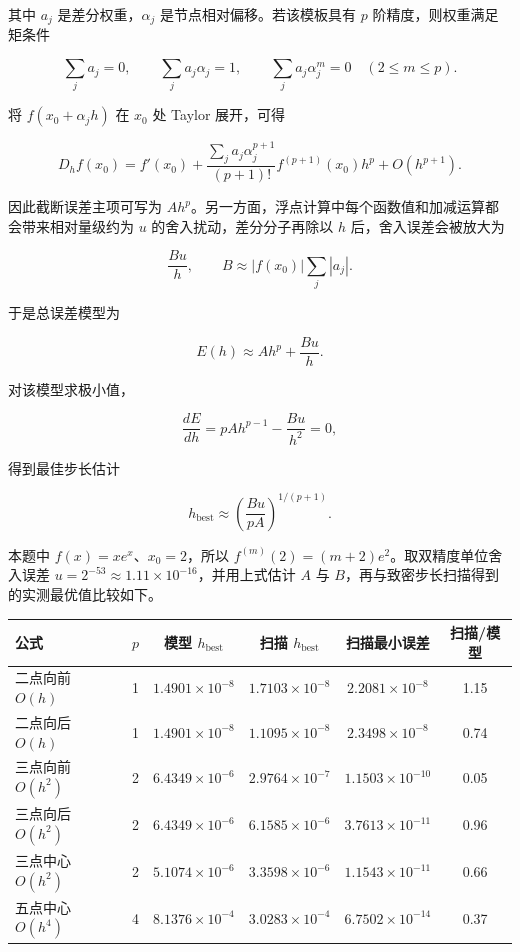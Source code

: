 \documentclass[12pt,a4paper,fontset=none]{ctexart}
\renewcommand{\arraystretch}{1.16}%
\begin{document}
其中 \(a_j\) 是差分权重，\(\alpha_j\) 是节点相对偏移。若该模板具有 \(p\) 阶精度，则权重满足矩条件

\[
\sum_j a_j=0,\qquad
\sum_j a_j\alpha_j=1,\qquad
\sum_j a_j\alpha_j^m=0\quad (2\le m\le p).
\]

将 \(f(x_0+\alpha_jh)\) 在 \(x_0\) 处 Taylor 展开，可得

\[
D_h f(x_0)
=f'(x_0)
+\frac{\sum_j a_j\alpha_j^{p+1}}{(p+1)!}f^{(p+1)}(x_0)h^p
+O(h^{p+1}).
\]

因此截断误差主项可写为 \(Ah^p\)。另一方面，浮点计算中每个函数值和加减运算都会带来相对量级约为 \(u\) 的舍入扰动，差分分子再除以 \(h\) 后，舍入误差会被放大为

\[
\frac{Bu}{h},\qquad
B\approx |f(x_0)|\sum_j |a_j|.
\]

于是总误差模型为

\[
E(h)\approx Ah^p+\frac{Bu}{h}.
\]

对该模型求极小值，

\[
\frac{dE}{dh}=pAh^{p-1}-\frac{Bu}{h^2}=0,
\]

得到最佳步长估计

\[
h_{\mathrm{best}}\approx \left(\frac{Bu}{pA}\right)^{1/(p+1)}.
\]

本题中 \(f(x)=xe^x\)、\(x_0=2\)，所以 \(f^{(m)}(2)=(m+2)e^2\)。取双精度单位舍入误差 \(u=2^{-53}\approx 1.11\times 10^{-16}\)，并用上式估计 \(A\) 与 \(B\)，再与致密步长扫描得到的实测最优值比较如下。

\begin{table}[H]
  \centering
  \small
  \setlength{\tabcolsep}{3pt}
  \renewcommand{\arraystretch}{1.12}
  \begin{tabular*}{\linewidth}{@{\extracolsep{\fill}}lccccc}
    \toprule
    公式 & \(p\) & 模型 \(h_{\mathrm{best}}\) & 扫描 \(h_{\mathrm{best}}\) & 扫描最小误差 & 扫描/模型 \\
    \midrule
    二点向前 \(O(h)\) & 1 & \(1.4901\times 10^{-8}\) & \(1.7103\times 10^{-8}\) & \(2.2081\times 10^{-8}\) & 1.15 \\
    二点向后 \(O(h)\) & 1 & \(1.4901\times 10^{-8}\) & \(1.1095\times 10^{-8}\) & \(2.3498\times 10^{-8}\) & 0.74 \\
    三点向前 \(O(h^2)\) & 2 & \(6.4349\times 10^{-6}\) & \(2.9764\times 10^{-7}\) & \(1.1503\times 10^{-10}\) & 0.05 \\
    三点向后 \(O(h^2)\) & 2 & \(6.4349\times 10^{-6}\) & \(6.1585\times 10^{-6}\) & \(3.7613\times 10^{-11}\) & 0.96 \\
    三点中心 \(O(h^2)\) & 2 & \(5.1074\times 10^{-6}\) & \(3.3598\times 10^{-6}\) & \(1.1543\times 10^{-11}\) & 0.66 \\
    五点中心 \(O(h^4)\) & 4 & \(8.1376\times 10^{-4}\) & \(3.0283\times 10^{-4}\) & \(6.7502\times 10^{-14}\) & 0.37 \\
    \bottomrule
  \end{tabular*}
\end{table}
\end{document}
